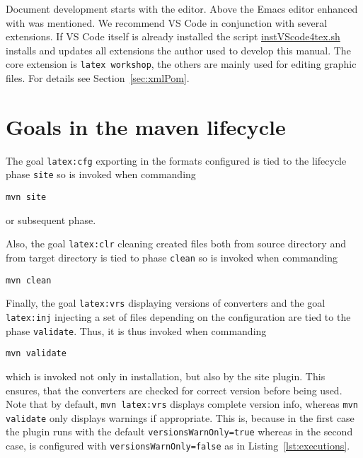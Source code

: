 Document development starts with the editor. 
Above the Emacs editor enhanced with \auctex{} was mentioned. 
We recommend VS Code in conjunction with several extensions. 
If VS Code itself is already installed 
the script \href{\urlSite fromMain/instVScode4tex}{instVScode4tex.sh} 
installs and updates all extensions 
the author used to develop this manual. 
The core extension is \texttt{latex workshop}, 
the others are mainly used for editing graphic files. 
For details see Section~\ref{sec:xmlPom}. 








\section{Goals in the maven lifecycle}\label{sec:usageLifecycle}

The goal \texttt{latex:cfg} exporting in the formats configured
is tied to the lifecycle phase \texttt{site} so is invoked
when commanding
%
\begin{Verbatim}[fontsize=\scriptsize]
mvn site
\end{Verbatim}
%
or subsequent phase.

Also, the goal \texttt{latex:clr} cleaning created files
both from source directory and from target directory
is tied to phase \texttt{clean} so is invoked
when commanding
%
\begin{Verbatim}[fontsize=\scriptsize]
mvn clean
\end{Verbatim}

Finally, the goal \texttt{latex:vrs} displaying versions of converters 
and the goal \texttt{latex:inj} injecting a set of files 
depending on the configuration 
are tied to the phase \texttt{validate}. 
Thus, it is thus invoked when commanding
%
\begin{Verbatim}[fontsize=\scriptsize]
mvn validate
\end{Verbatim}
%
which is invoked not only in installation, but also by the site plugin.
This ensures, that the converters are checked for correct version
before being used. 
Note that by default, \texttt{mvn latex:vrs} displays complete version info,
whereas \texttt{mvn validate} only displays warnings if appropriate. 
This is, because in the first case the plugin runs with the default \texttt{versionsWarnOnly=true} 
whereas in the second case, is configured with \texttt{versionsWarnOnly=false} 
as in Listing~\ref{lst:executions}. 




